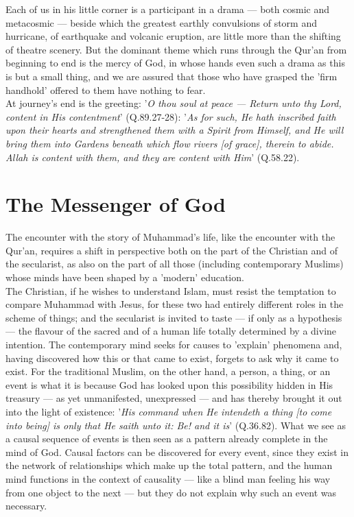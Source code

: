 \documentclass[10pt, twoside]{book}
\begin{document}
Each of us in his little corner is a participant in a drama --- both cosmic and metacosmic --- beside 
which the greatest earthly convulsions of storm and hurricane, of earthquake and volcanic eruption, 
are little more than the shifting of theatre scenery. But the dominant theme which runs through the 
Qur'an from beginning to end is the mercy of God, in whose hands even such a drama as this is but a 
small thing, and we are assured that those who have grasped the 'firm handhold' offered to them have 
nothing to fear. \\

At journey's end is the greeting: '\emph{O thou soul at peace --- Return unto thy Lord, content in His 
contentment}' (Q.89.27-28): '\emph{As for such, He hath inscribed faith upon their hearts and strengthened them with a Spirit from Himself, and He will bring them into Gardens beneath which flow rivers [of grace], therein to abide. Allah is content with them, and they are content with Him}' (Q.58.22). \\

\chapter{The Messenger of God}

The encounter with the story of Muhammad's life, like the encounter with the Qur'an, requires a shift 
in perspective both on the part of the Christian and of the secularist, as also on the part of all 
those (including contemporary Muslims) whose minds have been shaped by a 'modern' education. \\

The Christian, if he wishes to understand Islam, must resist the temptation to compare Muhammad with 
Jesus, for these two had entirely different roles in the scheme of things; and the secularist is 
invited to taste --- if only as a hypothesis --- the flavour of the sacred and of a human life totally 
determined by a divine intention. The contemporary mind seeks for causes to 'explain' phenomena and, 
having discovered how this or that came to exist, forgets to ask why it came to exist. For the 
traditional Muslim, on the other hand, a person, a thing, or an event is what it is because God has 
looked upon this possibility hidden in His treasury --- as yet unmanifested, unexpressed --- and has 
thereby brought it out into the light of existence: '\emph{His command when He intendeth a thing [to come into being] is only that He saith unto it: Be! and it is}' (Q.36.82). What we see as a causal sequence 
of events is then seen as a pattern already complete in the mind of God. Causal factors can be 
discovered for every event, since they exist in the network of relationships which make up the total 
pattern, and the human mind functions in the context of causality --- like a blind man feeling his way 
from one object to the next --- but they do not explain why such an event was necessary. \\
\end{document}
